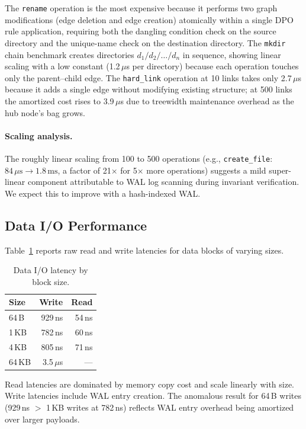 \documentclass[11pt,a4paper]{article}
\theoremstyle{definition}
\theoremstyle{remark}
\begin{document}
The \texttt{rename} operation is the most expensive because it
performs two graph modifications (edge deletion and edge creation)
atomically within a single DPO rule application, requiring both the
dangling condition check on the source directory and the unique-name
check on the destination directory. The \texttt{mkdir} chain benchmark
creates directories $d_1/d_2/\ldots/d_n$ in sequence, showing linear
scaling with a low constant (1.2\,$\mu$s per directory) because each
operation touches only the parent--child edge. The \texttt{hard\_link}
operation at 10 links takes only 2.7\,$\mu$s because it adds a single
edge without modifying existing structure; at 500 links the amortized
cost rises to 3.9\,$\mu$s due to treewidth maintenance overhead as the
hub node's bag grows.

\paragraph{Scaling analysis.}
The roughly linear scaling from 100 to 500 operations (e.g.,
\texttt{create\_file}: $84\,\mu\text{s} \to 1.8\,\text{ms}$, a
factor of 21$\times$ for 5$\times$ more operations) suggests a
mild super-linear component attributable to WAL log scanning
during invariant verification. We expect this to improve with a
hash-indexed WAL.

\subsection{Data I/O Performance}
\label{sec:eval-io}

Table~\ref{tab:io} reports raw read and write latencies for data
blocks of varying sizes.

\begin{table}[H]
\centering
\caption{Data I/O latency by block size.}
\label{tab:io}
\small
\begin{tabular}{@{}lrr@{}}
\toprule
\textbf{Size} & \textbf{Write} & \textbf{Read} \\
\midrule
64\,B  & 929\,ns & 54\,ns \\
1\,KB  & 782\,ns & 60\,ns \\
4\,KB  & 805\,ns & 71\,ns \\
64\,KB & 3.5\,$\mu$s & --- \\
\bottomrule
\end{tabular}
\end{table}

Read latencies are dominated by memory copy cost and scale linearly
with size. Write latencies include WAL entry creation. The anomalous
result for 64\,B writes (929\,ns $>$ 1\,KB writes at 782\,ns)
reflects WAL entry overhead being amortized over larger payloads.
\end{document}
